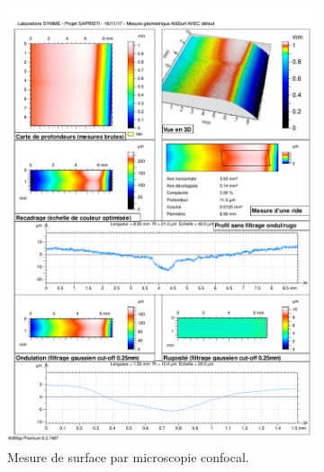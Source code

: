 \begin{figure}[tbhp!]
\begin{subfigure}[c]{0.48\textwidth}
		\includegraphics[width=\textwidth]{../Chap2/Figures/altisurf_defect.pdf}
		\caption{Mesure de surface par microscopie confocal.}
	\end{subfigure} \\
	\vspace{3\baselineskip}
	\begin{subfigure}[c]{\textwidth}
		\centering

\end{subfigure}
\end{figure}
